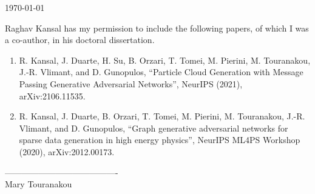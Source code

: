 \documentclass{article}
\begin{document}
\today

Raghav Kansal has my permission to include the following papers, of which
I was a co-author, in his doctoral dissertation.

\begin{enumerate}
    \item R. Kansal, J. Duarte, H. Su, B. Orzari, T. Tomei, M. Pierini, M. Touranakou, J.-R. Vlimant, and D. Gunopulos, “Particle Cloud Generation with Message Passing Generative Adversarial Networks”, NeurIPS (2021), arXiv:2106.11535.
    \item R. Kansal, J. Duarte, B. Orzari, T. Tomei, M. Pierini, M. Touranakou, J.-R. Vlimant, and D. Gunopulos, “Graph generative adversarial networks for sparse data generation in high energy physics”, NeurIPS ML4PS Workshop (2020), arXiv:2012.00173.
\end{enumerate}

\baselineskip
----------------------------------------\\
Mary Touranakou
\end{document}

